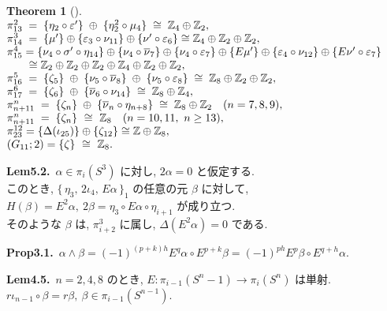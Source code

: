 \documentclass[10pt, leqno]{ltjsarticle}
\makeatletter
\newenvironment{Thleft}[1][]{%
  \begin{theorem}[#1]\mbox{}\\[0ex]\begingroup
  \setlength{\arraycolsep}{0pt}%
  \renewcommand{\arraystretch}{1.0}%
  \noindent$\begin{array}{@{}l@{}}%
}{%
  \end{array}$\par\endgroup\end{theorem}%
}
\newcommand{\todai}[2][]{\{\,#2\,\}_{#1}}      %
\newcommand{\gen}[1]{\{#1\}}       %
\newcommand{\pis}[2]{\pi_{#1}(#2)}       %
\newcommand{\pit}[2]{\pi_{#1}^{#2}}
\numberwithin{equation}{section}
\theoremstyle{plain}
\newtheorem{theorem}{Theorem}[section]
\theoremstyle{definition}
\theoremstyle{remark}
\makeatother
\begin{document}
\begin{paracol}{2}
\begin{Thleft}[]
\pit{13}{2} \;=\; \gen{\eta_{2}\circ \varepsilon'} \;\oplus\; \gen{\eta_{2}^{2}\circ \mu_{4}}
  \;\cong\; \mathbb Z_{4}\oplus\mathbb Z_{2},\\
\pit{14}{3} \;=\; \gen{\mu'} \oplus \gen{\varepsilon_3\circ\nu_{11}} \oplus \gen{\nu'\circ\varepsilon_6}
  \cong \mathbb{Z}_4 \oplus \mathbb{Z}_2 \oplus \mathbb{Z}_2,\\
\pit{15}{4} = \gen{\nu_{4}\circ \sigma'\circ\eta_{14}} \oplus \gen{\nu_{4}\circ \overline{\nu}_{7}}
  \oplus \gen{\nu_{4}\circ \varepsilon_{7}} \oplus \gen{E \mu'}
  \oplus \gen{\varepsilon_4\circ\nu_{12}} \oplus \gen{E\nu'\circ\varepsilon_7}\\
  \qquad \cong \mathbb Z_{2}\oplus\mathbb Z_{2}\oplus\mathbb Z_{2}\oplus\mathbb Z_{4}
  \oplus\mathbb Z_{2}\oplus\mathbb Z_{2},\\
\pit{16}{5} \;=\; \gen{\zeta_{5}} \;\oplus\; \gen{\nu_{5}\circ \overline{\nu}_{8}}
  \;\oplus\; \gen{\nu_{5}\circ \varepsilon_{8}}
  \;\cong\; \mathbb Z_{8}\oplus\mathbb Z_{2}\oplus\mathbb Z_{2},\\
\pit{17}{6} \;=\; \gen{\zeta_{6}} \;\oplus\; \gen{\overline{\nu}_{6}\circ \nu_{14}}
  \;\cong\; \mathbb Z_{8}\oplus\mathbb Z_{4},\\
\pit{n+11}{n} \;=\; \gen{\zeta_{n}} \;\oplus\; \gen{\overline{\nu}_{n}\circ \eta_{n+8}}
  \;\cong\; \mathbb Z_{8}\oplus\mathbb Z_{2}\quad (n=7,8,9),\\
\pit{n+11}{n} \;=\; \gen{\zeta_{n}}\ \cong\ \mathbb Z_{8}\quad (n=10,11, \ n\ge13), \\
\pit{23}{12} = \gen{\Delta(\iota_{25})}\oplus\gen{\zeta_{12}}\cong\mathbb Z\oplus\mathbb Z_{8},\\
(G_{11};2)=\gen{\zeta}\ \cong\ \mathbb Z_{8}.
\end{Thleft}

\switchcolumn

\noindent
\textbf{Lem5.2.}\
\(\alpha\in\pi_{i}(S^{3})\) に対し,
\(2\alpha=0\) と仮定する. \\
このとき,
\(\todai[1]{\eta_3,\,2\iota_4,\,E\alpha}\) 
の任意の元 \(\beta\) に対して,\\
\(
H(\beta)=E^{2}\alpha,\
2\beta=\eta_3\circ E\alpha\circ \eta_{i+1}
\)
が成り立つ. \\
そのような \(\beta\) は,
\(\pi^{3}_{i+2}\) に属し, \(\Delta(E^{2}\alpha)=0\) である. 

\noindent
\textbf{Prop3.1.}\
\(
\alpha \wedge \beta
= (-1)^{(p+k)h} E^{q}\alpha \circ E^{p+k}\beta
= (-1)^{ph} E^{p}\beta \circ E^{q+h}\alpha .
\)

\noindent
\textbf{Lem4.5.}\
\(n=2,4,8\) のとき, 
\(E:\pis{i-1}{S^n-1}\to\pis{i}{S^n}\) は単射.\\ 
\(r\iota_{n-1}\circ\beta = r\beta,\ \beta\in\pis{i-1}{S^{n-1}}\).




\end{paracol}
\end{document}
